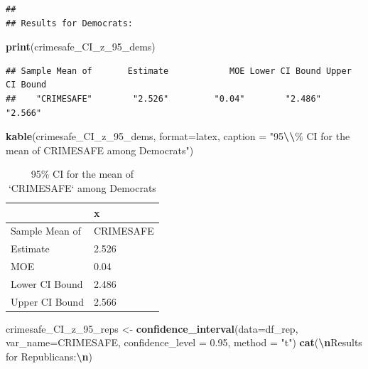 \documentclass[
  11pt,
]{article}
\newenvironment{Shaded}{\begin{snugshade}}{\end{snugshade}}
\newcommand{\AttributeTok}[1]{\textcolor[rgb]{0.13,0.29,0.53}{#1}}
\newcommand{\FloatTok}[1]{\textcolor[rgb]{0.00,0.00,0.81}{#1}}
\newcommand{\FunctionTok}[1]{\textcolor[rgb]{0.13,0.29,0.53}{\textbf{#1}}}
\newcommand{\NormalTok}[1]{#1}
\newcommand{\OtherTok}[1]{\textcolor[rgb]{0.56,0.35,0.01}{#1}}
\newcommand{\SpecialCharTok}[1]{\textcolor[rgb]{0.81,0.36,0.00}{\textbf{#1}}}
\newcommand{\StringTok}[1]{\textcolor[rgb]{0.31,0.60,0.02}{#1}}
\begin{document}
\begin{verbatim}
## 
## Results for Democrats:
\end{verbatim}

\begin{Shaded}
\begin{Highlighting}[]
\FunctionTok{print}\NormalTok{(crimesafe\_CI\_z\_95\_dems)}
\end{Highlighting}
\end{Shaded}

\begin{verbatim}
## Sample Mean of       Estimate            MOE Lower CI Bound Upper CI Bound 
##    "CRIMESAFE"        "2.526"         "0.04"        "2.486"        "2.566"
\end{verbatim}

\begin{Shaded}
\begin{Highlighting}[]
\FunctionTok{kable}\NormalTok{(crimesafe\_CI\_z\_95\_dems, }\AttributeTok{format=}\StringTok{\textquotesingle{}latex\textquotesingle{}}\NormalTok{, }\AttributeTok{caption =} \StringTok{"95}\SpecialCharTok{\textbackslash{}\textbackslash{}}\StringTok{\% CI for the mean of \textasciigrave{}CRIMESAFE\textasciigrave{} among Democrats"}\NormalTok{)}
\end{Highlighting}
\end{Shaded}

\begin{table}

\caption{\label{tab:q1-d-part1}95\% CI for the mean of `CRIMESAFE` among Democrats}
\centering
\begin{tabular}[t]{l|l}
\hline
  & x\\
\hline
Sample Mean of & CRIMESAFE\\
\hline
Estimate & 2.526\\
\hline
MOE & 0.04\\
\hline
Lower CI Bound & 2.486\\
\hline
Upper CI Bound & 2.566\\
\hline
\end{tabular}
\end{table}

\begin{Shaded}
\begin{Highlighting}[]
\NormalTok{crimesafe\_CI\_z\_95\_reps }\OtherTok{\textless{}{-}} \FunctionTok{confidence\_interval}\NormalTok{(}\AttributeTok{data=}\NormalTok{df\_rep, }
                                         \AttributeTok{var\_name=}\StringTok{\textquotesingle{}CRIMESAFE\textquotesingle{}}\NormalTok{, }
                                         \AttributeTok{confidence\_level =} \FloatTok{0.95}\NormalTok{, }\AttributeTok{method =} \StringTok{"t"}\NormalTok{)}
\FunctionTok{cat}\NormalTok{(}\StringTok{\textquotesingle{}}\SpecialCharTok{\textbackslash{}n}\StringTok{Results for Republicans:}\SpecialCharTok{\textbackslash{}n}\StringTok{\textquotesingle{}}\NormalTok{)}
\end{Highlighting}
\end{Shaded}
\end{document}
